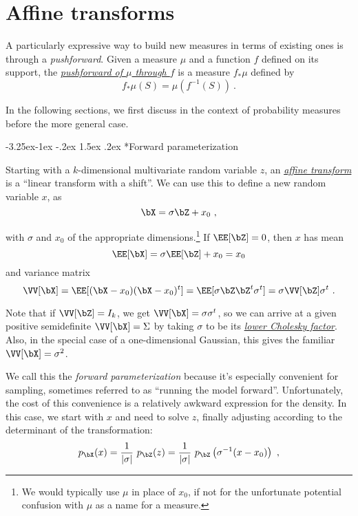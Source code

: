 \documentclass{juliacon}
\makeatletter
\renewcommand\subsection{\@startsection{subsection}{2}{\z@}%
{-3.25ex\@plus -1ex \@minus -.2ex}%
{1.5ex \@plus .2ex}%
{\normalfont\bfseries}}
\makeatother
\begin{document}
\section{Affine transforms}
\label{affine}

A particularly expressive way to build new measures in terms of existing ones is through a \emph{pushforward}. Given a measure $\mu$ and a function $f$ defined on its support, the \href{https://en.wikipedia.org/wiki/Pushforward_measure}{\emph{pushforward of $\mu$ through $f$}} is a measure $f_*\mu$ defined by
\[
f_*\mu(S) = \mu(f^{-1}(S))\ .
\]

In the following sections, we first discuss in the context of probability measures before the more general case.

\subsection*{Forward parameterization}

Starting with a $k$-dimensional multivariate random variable $z$, an \href{https://en.wikipedia.org/wiki/Affine_transformation}{\emph{affine transform}} is a ``linear transform with a shift''. We can use this to define a new random variable $x$, as
\[
\bX = \sigma \bZ + x_0\ ,
\]

with $\sigma$ and $x_0$ of the appropriate dimensions.\footnote{We would typically use $\mu$ in place of $x_0$, if not for the unfortunate potential confusion with $\mu$ as a name for a measure.} If $\EE[\bZ]=0$, then $x$ has mean
\[
\EE[\bX] = \sigma \EE[\bZ] + x_0 = x_0
\]
and variance matrix
\[
\VV[\bX] = \EE[(\bX-x_0)(\bX-x_0)^t] = \EE[\sigma \bZ \bZ^t \sigma^t] = \sigma \VV[\bZ] \sigma^t\ .
\]

Note that if $\VV[\bZ]=I_k$, we get $\VV[\bX]=\sigma \sigma^t$, so we can arrive at a given positive semidefinite $\VV[\bX]=\Sigma$ by taking $\sigma$ to be its \href{https://en.wikipedia.org/wiki/Cholesky_decomposition}{\emph{lower Cholesky factor}}. Also, in the special case of a one-dimensional Gaussian, this gives the familiar $\VV[\bX] = \sigma^2$.

We call this the \emph{forward parameterization} because it's especially convenient for sampling, sometimes referred to as ``running the model forward''. Unfortunately, the cost of this convenience is a relatively awkward expression for the density. In this case, we start with $x$ and need to solve $z$, finally adjusting according to the determinant of the transformation:
\[
p_\bX(x) = \frac{1}{|\sigma|}\ p_\bZ(z) = \frac{1}{|\sigma|}\ p_\bZ\left(\sigma^{-1} (x - x_0)\right)\ ,
\]
\end{document}
